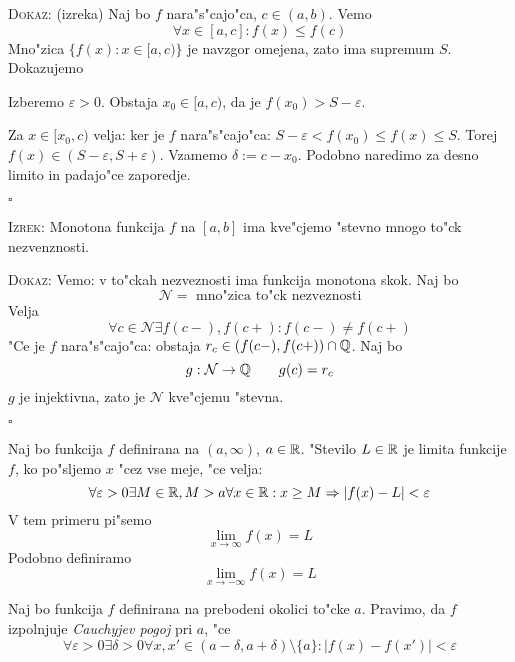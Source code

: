 \textsc{Dokaz:} (izreka) Naj bo $f$ nara"s"cajo"ca, $c \in (a, b)$. Vemo
\begin{equation*}
\forall x \in [a, c]: f(x) \leq f(c)
\end{equation*}
Mno"zica $\{f(x): x \in [a, c)\}$ je navzgor omejena, zato ima supremum $S$. Dokazujemo 

Izberemo $\varepsilon > 0$. Obstaja $x_0 \in [a, c)$, da je $f(x_0) > S - \varepsilon$.

Za $x \in [x_0, c)$ velja: ker je $f$ nara"s"cajo"ca: $S - \varepsilon < f(x_0) \leq f(x) \leq S$. Torej $f(x) \in (S - \varepsilon, S + \varepsilon)$. Vzamemo $\delta := c - x_0$. Podobno naredimo za desno limito in padajo"ce zaporedje.

\hfill $\square$

\textsc{Izrek:} Monotona funkcija $f$ na $[a, b]$ ima kve"cjemo "stevno mnogo to"ck nezvenznosti.

\textsc{Dokaz:} Vemo: v to"ckah nezveznosti ima funkcija monotona skok. Naj bo
\begin{equation*}
\mathcal{N} = \text{ mno"zica to"ck nezveznosti}
\end{equation*}
Velja
\begin{equation*}
\forall c \in \mathcal{N} \exists f(c-), f(c+): f(c-) \neq f(c+)
\end{equation*}
"Ce je $f$ nara"s"cajo"ca: obstaja $r_c \in (f(c-), f(c+)) \cap \mathbb{Q}$. Naj bo
\begin{equation*}
g: \mathcal{N} \to \mathbb{Q} \qquad g(c) = r_c
\end{equation*}
$g$ je injektivna, zato je $\mathcal{N}$ kve"cjemu "stevna.

\hfill $\square$

 Naj bo funkcija $f$ definirana na $(a, \infty)$, $a \in \mathbb{R}$. "Stevilo $L \in \mathbb{R}$ je limita funkcije $f$, ko po"sljemo $x$ "cez vse meje, "ce velja:
\begin{equation*}
\forall \varepsilon > 0 \exists M  \in \mathbb{R}, M > a \forall x \in \mathbb{R}: x \geq M \Rightarrow |f(x) - L| < \varepsilon
\end{equation*}
V tem primeru pi"semo
\begin{equation*}
\lim_{x \to \infty} f(x) = L
\end{equation*}
Podobno definiramo
\begin{equation*}
\lim_{x \to - \infty} f(x) = L
\end{equation*}

 Naj bo funkcija $f$ definirana na prebodeni okolici to"cke $a$. Pravimo, da $f$ izpolnjuje \emph{Cauchyjev pogoj} pri $a$, "ce
\begin{equation*}
\forall \varepsilon > 0 \exists \delta >0 \forall x, x' \in (a - \delta, a + \delta) \setminus \{a\}: |f(x) - f(x')| < \varepsilon
\end{equation*}

